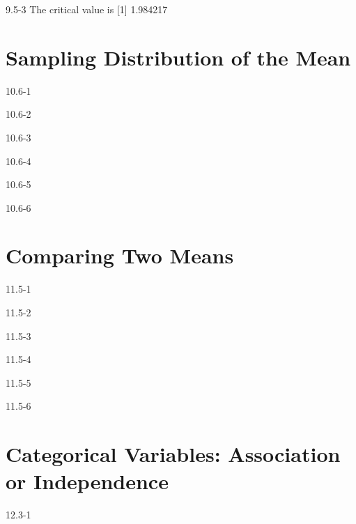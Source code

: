 \begin{exsol@solution}{9.5-3}
   The critical value is
[1] 1.984217

\end{exsol@solution}
\setcounter{chapter}{10}\chapter{Sampling Distribution of the Mean}
\begin{exsol@solution}{10.6-1}
\end{exsol@solution}
\begin{exsol@solution}{10.6-2}
\end{exsol@solution}
\begin{exsol@solution}{10.6-3}
\end{exsol@solution}
\begin{exsol@solution}{10.6-4}
\end{exsol@solution}
\begin{exsol@solution}{10.6-5}
\end{exsol@solution}
\begin{exsol@solution}{10.6-6}
\end{exsol@solution}
\setcounter{chapter}{11}\chapter{Comparing Two Means}
\begin{exsol@solution}{11.5-1}

\end{exsol@solution}
\begin{exsol@solution}{11.5-2}
\end{exsol@solution}
\begin{exsol@solution}{11.5-3}
\end{exsol@solution}
\begin{exsol@solution}{11.5-4}

\end{exsol@solution}
\begin{exsol@solution}{11.5-5}
\end{exsol@solution}
\begin{exsol@solution}{11.5-6}
\end{exsol@solution}
\setcounter{chapter}{12}\chapter{Categorical Variables: Association or Independence}
\begin{exsol@solution}{12.3-1}
\end{exsol@solution}
